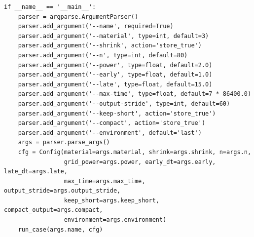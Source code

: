 \begin{verbatim}
if __name__ == '__main__':
    parser = argparse.ArgumentParser()
    parser.add_argument('--name', required=True)
    parser.add_argument('--material', type=int, default=3)
    parser.add_argument('--shrink', action='store_true')
    parser.add_argument('--n', type=int, default=80)
    parser.add_argument('--power', type=float, default=2.0)
    parser.add_argument('--early', type=float, default=1.0)
    parser.add_argument('--late', type=float, default=15.0)
    parser.add_argument('--max-time', type=float, default=7 * 86400.0)
    parser.add_argument('--output-stride', type=int, default=60)
    parser.add_argument('--keep-short', action='store_true')
    parser.add_argument('--compact', action='store_true')
    parser.add_argument('--environment', default='last')
    args = parser.parse_args()
    cfg = Config(material=args.material, shrink=args.shrink, n=args.n,
                 grid_power=args.power, early_dt=args.early, late_dt=args.late,
                 max_time=args.max_time, output_stride=args.output_stride,
                 keep_short=args.keep_short, compact_output=args.compact,
                 environment=args.environment)
    run_case(args.name, cfg)

\end{verbatim}

